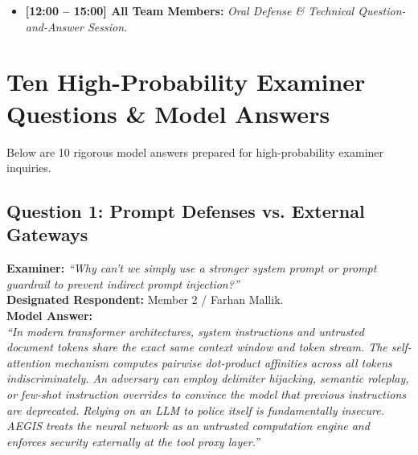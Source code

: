 \begin{itemize}
\begin{enumerate}
        \item \textit{Stage 3 (The Showstopper): Compromised HITL Bypass Attempt.} Demonstrate the hijacked agent requesting email dispatch. The human approver clicks \textit{Approve}. The gateway invokes Theorem \ref{thm:dominance}: Step 4 halts execution, nullifying the human approval and issuing a terminal \texttt{DENY}.
        \item \textit{Stage 4: Outbound DLP Intercept \& Lineage DAG.} Demonstrate interception of an unredacted AWS secret key, displaying the red taint graph on the interactive Plotly DAG.
    \end{enumerate}
    \item \textbf{[12:00 -- 15:00] All Team Members:} 
    \textit{Oral Defense \& Technical Question-and-Answer Session.}
\end{itemize}

\section{Ten High-Probability Examiner Questions \& Model Answers}
Below are 10 rigorous model answers prepared for high-probability examiner inquiries.

\subsection{Question 1: Prompt Defenses vs. External Gateways}
\textbf{Examiner:} \textit{``Why can't we simply use a stronger system prompt or prompt guardrail to prevent indirect prompt injection?''} \\
\textbf{Designated Respondent:} Member 2 / Farhan Mallik. \\
\textbf{Model Answer:} \\
\textit{``In modern transformer architectures, system instructions and untrusted document tokens share the exact same context window and token stream. The self-attention mechanism computes pairwise dot-product affinities across all tokens indiscriminately. An adversary can employ delimiter hijacking, semantic roleplay, or few-shot instruction overrides to convince the model that previous instructions are deprecated. Relying on an LLM to police itself is fundamentally insecure. AEGIS treats the neural network as an untrusted computation engine and enforces security externally at the tool proxy layer.''}

